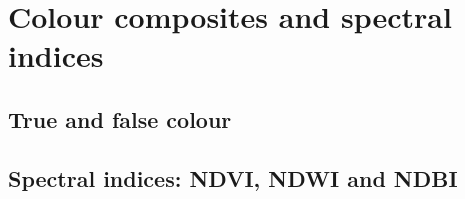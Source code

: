 \chapter{Colour composites and spectral indices}\label{ch:indices}
\section{True and false colour}

\section{Spectral indices: NDVI, NDWI and NDBI}

